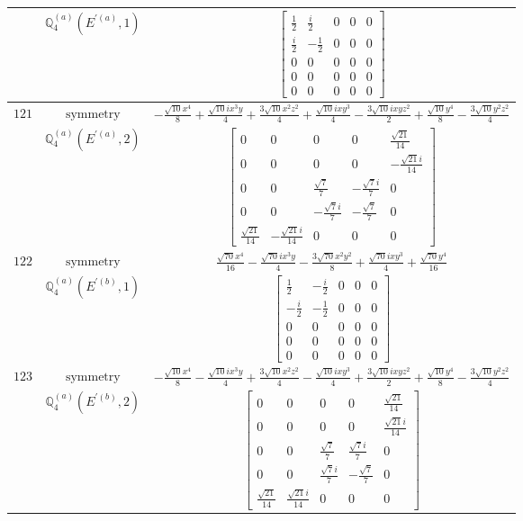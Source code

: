 \documentclass[fleqn,8pt,landscape]{jsarticle}
\begin{document}
\begin{longtable}{ccc}
$  $ & $ \mathbb{Q}_{4}^{(a)}(E^{\prime(a)},1) $ & $ \begin{bmatrix} \frac{1}{2} & \frac{i}{2} & 0 & 0 & 0 \\ \frac{i}{2} & - \frac{1}{2} & 0 & 0 & 0 \\ 0 & 0 & 0 & 0 & 0 \\ 0 & 0 & 0 & 0 & 0 \\ 0 & 0 & 0 & 0 & 0 \end{bmatrix} $ \\ \hline
$ 121 $ & $ \text{symmetry} $ & $ - \frac{\sqrt{10} x^{4}}{8} + \frac{\sqrt{10} i x^{3} y}{4} + \frac{3 \sqrt{10} x^{2} z^{2}}{4} + \frac{\sqrt{10} i x y^{3}}{4} - \frac{3 \sqrt{10} i x y z^{2}}{2} + \frac{\sqrt{10} y^{4}}{8} - \frac{3 \sqrt{10} y^{2} z^{2}}{4} $ \\
$  $ & $ \mathbb{Q}_{4}^{(a)}(E^{\prime(a)},2) $ & $ \begin{bmatrix} 0 & 0 & 0 & 0 & \frac{\sqrt{21}}{14} \\ 0 & 0 & 0 & 0 & - \frac{\sqrt{21} i}{14} \\ 0 & 0 & \frac{\sqrt{7}}{7} & - \frac{\sqrt{7} i}{7} & 0 \\ 0 & 0 & - \frac{\sqrt{7} i}{7} & - \frac{\sqrt{7}}{7} & 0 \\ \frac{\sqrt{21}}{14} & - \frac{\sqrt{21} i}{14} & 0 & 0 & 0 \end{bmatrix} $ \\ \hline
$ 122 $ & $ \text{symmetry} $ & $ \frac{\sqrt{70} x^{4}}{16} - \frac{\sqrt{70} i x^{3} y}{4} - \frac{3 \sqrt{70} x^{2} y^{2}}{8} + \frac{\sqrt{70} i x y^{3}}{4} + \frac{\sqrt{70} y^{4}}{16} $ \\
$  $ & $ \mathbb{Q}_{4}^{(a)}(E^{\prime(b)},1) $ & $ \begin{bmatrix} \frac{1}{2} & - \frac{i}{2} & 0 & 0 & 0 \\ - \frac{i}{2} & - \frac{1}{2} & 0 & 0 & 0 \\ 0 & 0 & 0 & 0 & 0 \\ 0 & 0 & 0 & 0 & 0 \\ 0 & 0 & 0 & 0 & 0 \end{bmatrix} $ \\ \hline
$ 123 $ & $ \text{symmetry} $ & $ - \frac{\sqrt{10} x^{4}}{8} - \frac{\sqrt{10} i x^{3} y}{4} + \frac{3 \sqrt{10} x^{2} z^{2}}{4} - \frac{\sqrt{10} i x y^{3}}{4} + \frac{3 \sqrt{10} i x y z^{2}}{2} + \frac{\sqrt{10} y^{4}}{8} - \frac{3 \sqrt{10} y^{2} z^{2}}{4} $ \\
$  $ & $ \mathbb{Q}_{4}^{(a)}(E^{\prime(b)},2) $ & $ \begin{bmatrix} 0 & 0 & 0 & 0 & \frac{\sqrt{21}}{14} \\ 0 & 0 & 0 & 0 & \frac{\sqrt{21} i}{14} \\ 0 & 0 & \frac{\sqrt{7}}{7} & \frac{\sqrt{7} i}{7} & 0 \\ 0 & 0 & \frac{\sqrt{7} i}{7} & - \frac{\sqrt{7}}{7} & 0 \\ \frac{\sqrt{21}}{14} & \frac{\sqrt{21} i}{14} & 0 & 0 & 0 \end{bmatrix} $ \\ \hline

\end{longtable}
\end{document}
